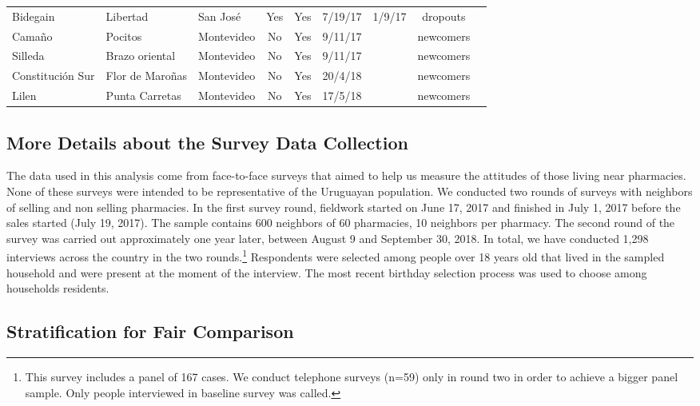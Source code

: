 \documentclass[11pt]{article}
\begin{document}
\begin{small}
\begin{table}[htbp!]
\begin{tabular}{@{}lllcccccc@{}}
 Bidegain	 	&	 	Libertad	 	&	 	San José	 	&	 	Yes	 	&	 	Yes	 	&	 	7/19/17	 	&	 	1/9/17	 	&	 	dropouts	\\
 Camaño	 	&	 	Pocitos	 	&	 	Montevideo	 	&	 	No	 	&	 	Yes	 	&	 	9/11/17	 	&	 		 	&	 	newcomers	\\
 Silleda	 	&	 	Brazo oriental	 	&	 	Montevideo	 	&	 	No	 	&	 	Yes	 	&	 	9/11/17	 	&	 		 	&	 	newcomers\\
 Constitución Sur	 	&	 	Flor de Maroñas	 	&	 	Montevideo	 	&	 	No	 	&	 	Yes	 	&	 	20/4/18	 	&	 		 	&	 	newcomers	\\
 Lilen	 	&	 	Punta Carretas	 	&	 	Montevideo	 	&	 	No	 	&	 	Yes	 	&	 	17/5/18	 	&	 		 	&	 	newcomers	\\
\bottomrule
\end{tabular}
\end{table}
\end{small}

\subsection{More Details about the Survey Data Collection}
The data used in this analysis come from face-to-face surveys that aimed to help us measure the attitudes of those living near pharmacies. None of these surveys were intended to be representative of the Uruguayan population. We conducted two rounds of surveys with neighbors of selling and non selling pharmacies. In the first survey round, fieldwork started on June 17, 2017 and finished in July 1, 2017 before the sales started (July 19, 2017). The sample contains 600 neighbors of 60 pharmacies, 10 neighbors per pharmacy. The second round of the survey was carried out approximately one year later, between August 9 and September 30, 2018. In total, we have conducted 1,298 interviews across the country in the two rounds.\footnote{This survey includes a panel of 167 cases. We conduct telephone surveys (n=59) only in round two in order to achieve a bigger panel sample. Only people interviewed in baseline survey was called.} Respondents were selected among people over 18 years old that lived in the sampled household and were present at the moment of the interview. The most recent birthday selection process was used to choose among households residents.

\subsection{Stratification for Fair Comparison}
\end{document}
